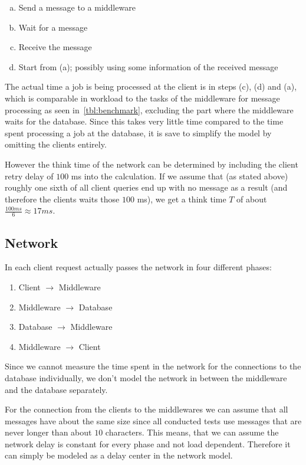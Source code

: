\documentclass[a4paper, oneside]{csthesis}
\begin{document}
    \begin{enumerate}[(a)]
        \item Send a message to a middleware
        \item Wait for a message
        \item Receive the message
        \item Start from (a); possibly using some information of the received
        message
    \end{enumerate}

    The actual time a job is being processed at the client is in steps (c), (d)
    and (a), which is comparable in workload to the tasks of the middleware for
    message processing as seen in~\cref{tbl:benchmark}, excluding the part where
    the middleware waits for the database. Since this takes very little time 
    compared to the time spent processing a job at the database, it is save to 
    simplify the model by omitting the clients entirely.
    
    However the think time of the network can be determined by including the
    client retry delay of $100$ ms into the calculation. If we assume that (as
    stated above) roughly one sixth of all client queries end up with no message
    as a result (and therefore the clients waits those $100$ ms), we get a think
    time $T$ of about $\frac{100ms}{6} \approx 17 ms$.

\subsection{Network}
    In \telesto each client request actually passes the network in four different 
    phases:

    \begin{enumerate}
        \item Client $\rightarrow$ Middleware
        \item Middleware $\rightarrow$ Database
        \item Database $\rightarrow$ Middleware
        \item Middleware $\rightarrow$ Client
    \end{enumerate}

    Since we cannot measure the time spent in the network for the connections to
    the database individually, we don't model the network in between the
    middleware and the database separately.

    For the connection from the clients to the middlewares we can assume that
    all messages have about the same size since all conducted tests use messages
    that are never longer than about $10$ characters. This means, that we can
    assume the network delay is constant for every phase and not load dependent.
    Therefore it can simply be modeled as a delay center in the network model.
\end{document}
